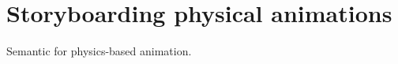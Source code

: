 \chapter{Storyboarding physical animations}
\label{chap:fluidstoryboard}
Semantic for physics-based animation.
